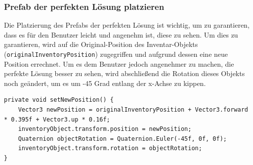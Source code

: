 \subsubsection{Prefab der perfekten Lösung platzieren}
Die Platzierung des Prefabs der perfekten Lösung ist wichtig, um zu garantieren, dass es für den Benutzer leicht und
angenehm ist, diese zu sehen. Um dies zu garantieren, wird auf die Original-Position des Inventar-Objekts (\texttt{originalInventoryPosition})
zugegriffen und aufgrund dessen eine neue Position errechnet. Um es dem Benutzer jedoch angenehmer zu machen, die perfekte
Lösung besser zu sehen, wird abschließend die Rotation dieses Objekts noch geändert, um es um -45 Grad entlang der x-Achse
zu kippen.
\begin{lstlisting}[style=csharp, caption={Neue Position setzen}, label=code:newPos_PSV]
private void setNewPosition() {
    Vector3 newPosition = originalInventoryPosition + Vector3.forward * 0.395f + Vector3.up * 0.16f;
    inventoryObject.transform.position = newPosition;
    Quaternion objectRotation = Quaternion.Euler(-45f, 0f, 0f);
    inventoryObject.transform.rotation = objectRotation;
}
\end{lstlisting}\\

